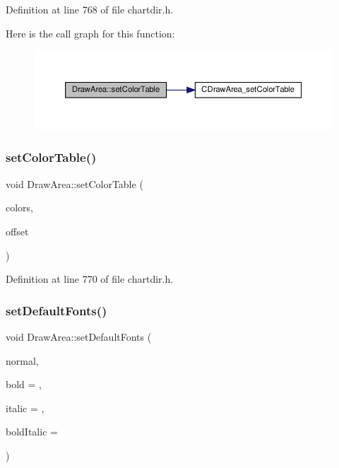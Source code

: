 Definition at line 768 of file chartdir.\+h.

Here is the call graph for this function\+:
\nopagebreak
\begin{figure}[H]
\begin{center}
\leavevmode
\includegraphics[width=350pt]{class_draw_area_a51598b0080fd71cd21e798bc208da31b_cgraph}
\end{center}
\end{figure}
\mbox{\label{class_draw_area_af3658625f17998dbdc0c8e0134f93ccd}} 
\subsubsection{\texorpdfstring{set\+Color\+Table()}{setColorTable()}\hspace{0.1cm}{\footnotesize\ttfamily [2/2]}}
{\footnotesize\ttfamily void Draw\+Area\+::set\+Color\+Table (\begin{DoxyParamCaption}\item[{\hyperlink{class_int_array}{Int\+Array}}]{colors,  }\item[{int}]{offset }\end{DoxyParamCaption})\hspace{0.3cm}{\ttfamily [inline]}}



Definition at line 770 of file chartdir.\+h.

\mbox{\label{class_draw_area_a91476cda6d13c03459292d90c1ec1836}} 
\subsubsection{\texorpdfstring{set\+Default\+Fonts()}{setDefaultFonts()}}
{\footnotesize\ttfamily void Draw\+Area\+::set\+Default\+Fonts (\begin{DoxyParamCaption}\item[{const char $\ast$}]{normal,  }\item[{const char $\ast$}]{bold = {},  }\item[{const char $\ast$}]{italic = {},  }\item[{const char $\ast$}]{bold\+Italic = {} }\end{DoxyParamCaption})\hspace{0.3cm}{\ttfamily [inline]}}



